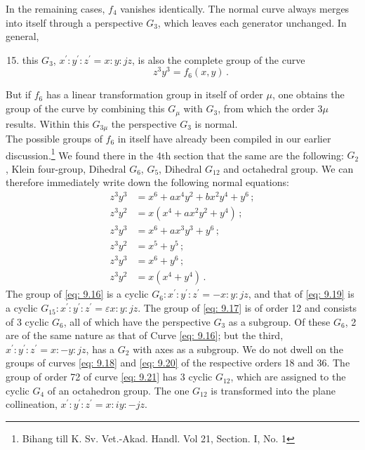 \documentclass[leqno]{article}
\begin{document}
In the remaining cases, $f_4$ vanishes identically. The normal curve always merges into itself through a perspective $G_3$, which leaves each generator unchanged. In general, 
\begin{enumerate}[label=\arabic*)]
    \setcounter{enumi}{14}
    \item this $G_3$, $x^\prime: y^\prime : z^\prime = x:y:jz$, is also the complete group of the curve 
    \begin{equation}\label{eq: 9.15}
    z^3 y^3 = f_6(x, y) \, . \tag{15}
    \end{equation}
\end{enumerate}
But if $f_6$ has a linear transformation group in itself of order $\mu$, one obtains the group of the curve by combining this $G_\mu$ with $G_3$, from which the order $3\mu$ results. Within this $G_{3 \mu}$ the perspective $G_3$ is normal. \\
The possible groups of $f_6$ in itself have already been compiled in our earlier discussion.\footnote{Bihang till K. Sv. Vet.-Akad. Handl. Vol 21, Section. I, No. 1} We found there in the 4th section that the same are the following: $G_2$, Klein four-group, Dihedral $G_6$, $G_5$, Dihedral $G_{12}$ and octahedral group. We can therefore immediately write down the following normal equations:
\begin{align}
	z^3 y^3 &= x^6 + ax^4 y^2 + bx^2 y^4 + y^6 \, ; \label{eq: 9.16} \tag{16} \\
	z^3 y^2 &= x(x^4 + ax^2 y^2 + y^4) \, ; \label{eq: 9.17} \tag{17} \\ 
	z^3 y^3 &= x^6 + a x^3 y^3 + y^6 \, ; \label{eq: 9.18} \tag{18} \\
	z^3 y^2 &= x^5 + y^5 \, ; \label{eq: 9.19} \tag{19} \\ 
	z^3 y^3 &= x^6 + y^6 \, ; \label{eq: 9.20} \tag{20} \\ 
	z^3 y^2 &= x(x^4 + y^4) \, . \label{eq: 9.21} \tag{21} 
\end{align}
The group of \eqref{eq: 9.16} is a cyclic $G_6 : x^\prime: y^\prime : z^\prime = - x : y: jz$, and that of \eqref{eq: 9.19} is a cyclic $G_{15} : x ^\prime : y^\prime : z^\prime = \varepsilon x : y : jz$. The group of \eqref{eq: 9.17} is of order 12 and consists of 3 cyclic $G_6$, all of which have the perspective $G_3$ as a subgroup. Of these $G_6$, 2 are of the same nature as that of Curve \eqref{eq: 9.16}; but the third, $x^\prime : y^\prime : z^\prime = x : -y : jz$, has a $G_2$ \guillemotright with axes\guillemotright{} as a subgroup. We do not dwell on the groups of curves \eqref{eq: 9.18} and \eqref{eq: 9.20} of the respective orders 18 and 36. The group of order 72 of curve \eqref{eq: 9.21} has 3 cyclic $G_{12}$, which are assigned to the cyclic $G_4$ of an octahedron group. The one $G_{12}$ is transformed into the plane collineation, $x^\prime : y^\prime : z^\prime = x : iy : -jz$. \\
\end{document}
